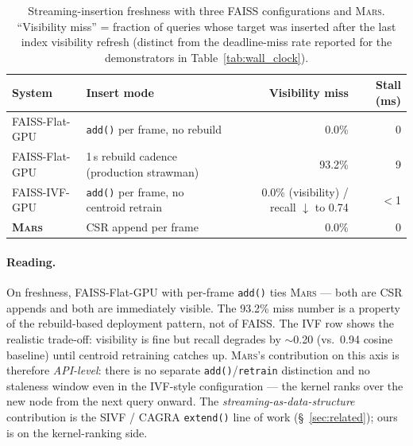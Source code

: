 \documentclass[11pt]{article}
\newcommand{\mars}{\textsc{Mars}}
\begin{document}
\begin{table}[ht]
\centering
\small
\caption{Streaming-insertion freshness with three FAISS
configurations and \mars{}. ``Visibility miss'' = fraction of queries
whose target was inserted after the last index visibility refresh
(distinct from the deadline-miss rate reported for the demonstrators
in Table~\ref{tab:wall_clock}).}
\label{tab:streaming}
\begin{tabular}{llrr}
\toprule
\textbf{System} & \textbf{Insert mode} & \textbf{Visibility miss} & \textbf{Stall (ms)} \\
\midrule
FAISS-Flat-GPU       & \texttt{add()} per frame, no rebuild & 0.0\%  & 0     \\
FAISS-Flat-GPU       & 1\,s rebuild cadence (production strawman) & 93.2\% & 9     \\
FAISS-IVF-GPU        & \texttt{add()} per frame, no centroid retrain & 0.0\% (visibility) / recall $\downarrow$ to 0.74 & $<$1 \\
\textbf{\mars{}}     & CSR append per frame                       & 0.0\%  & 0     \\
\bottomrule
\end{tabular}
\end{table}

\paragraph{Reading.} On freshness, FAISS-Flat-GPU with per-frame
\texttt{add()} ties \mars{} --- both are CSR appends and both are
immediately visible. The 93.2\% miss number is a property of the
rebuild-based deployment pattern, not of FAISS. The IVF row shows
the realistic trade-off: visibility is fine but recall degrades by
$\sim$0.20 (vs.\ 0.94 cosine baseline) until centroid retraining
catches up. \mars{}'s contribution on this axis is therefore
\emph{API-level}: there is no separate \texttt{add()}/\texttt{retrain}
distinction and no staleness window even in the IVF-style
configuration --- the kernel ranks over the new node from the next
query onward. The \emph{streaming-as-data-structure} contribution is
the SIVF / CAGRA \texttt{extend()} line of work
(\S~\ref{sec:related}); ours is on the kernel-ranking side.
\end{document}
